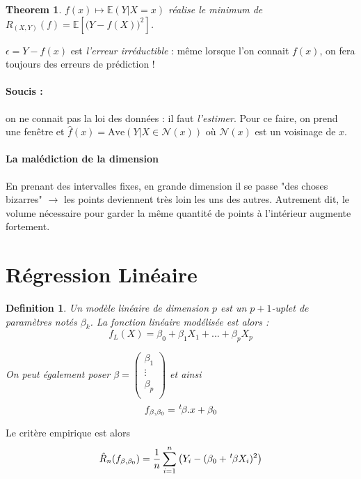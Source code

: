 \documentclass{article}
\newtheorem{thm}{Theorem}
\newtheorem{defi}{Definition}
\newcommand{\transpose}{\hspace{.1em}{}^t\hspace{-.1em}}
\begin{document}
\begin{thm}
$f(x) \mapsto \mathbb{E}(Y|X=x)$ réalise le minimum de $R_{(X,Y)}(f) = \mathbb{E}[\big(Y-f(X)\big)^2]$.
\end{thm}

$\epsilon = Y - f(x)$ est \emph{l'erreur irréductible} : même lorsque l'on connait $f(x)$, on fera toujours des erreurs de prédiction !

\paragraph{Soucis :} on ne connait pas la loi des données : il faut \emph{l'estimer}. Pour ce faire, on prend une fenêtre et $\hat{f}(x) = \text{Ave}(Y|X \in \mathcal{N}(x))$ où $\mathcal{N}(x)$ est un voisinage de $x$.

\paragraph{La malédiction de la dimension}
En prenant des intervalles fixes, en grande dimension il se passe "des choses bizarres" $\to$ les points deviennent très loin les uns des autres. Autrement dit, le volume nécessaire pour garder la même quantité de points à l'intérieur augmente fortement.

\section{Régression Linéaire}
\begin{defi}
Un modèle linéaire de dimension $p$ est un $p+1$-uplet de paramètres notés $\beta_k$. La fonction linéaire modélisée est alors :
\[f_L(X) = \beta_0 + \beta_1X_1 + ... + \beta_p X_p\]

On peut également poser $\beta = \begin{pmatrix}
\beta_1\\
\vdots\\
\beta_p\\
\end{pmatrix}$
et ainsi
\[f_{\beta,\beta_0} = \transpose \beta . x + \beta_0\]
\end{defi}

Le critère empirique est alors 
\[\hat{R}_n(f_{\beta,\beta_0}) = \dfrac{1}{n}\sum_{i=1}^n \big( Y_i - (\beta_0 + \transpose\beta X_i)^2\big)\]
\end{document}
